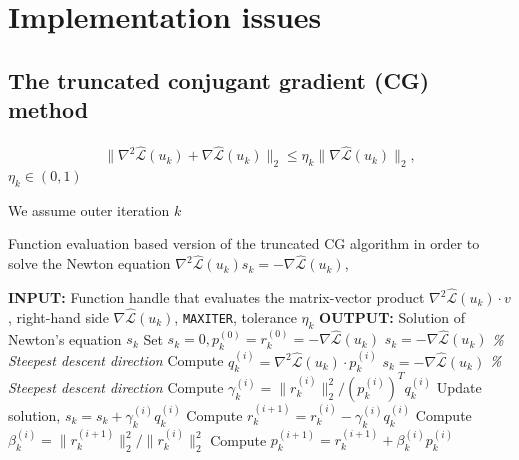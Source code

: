 \chapter{Implementation issues}
\section{The truncated conjugant gradient (CG) method}
\label{CGapp}
\begin{align}
 \label{CGcond}
 \|\nabla^2 \hat{\mathcal L}(u_k) + \nabla \hat{\mathcal L}(u_k)\|_2 \leq \eta_k \|\nabla\hat{\mathcal L}(u_k)\|_2,
\end{align}
$\eta_k \in (0,1)$

We assume outer iteration $k$
\begin{algorithm}[H]
\caption{Function evaluation based version of the truncated CG algorithm in order to solve the Newton equation $\nabla^2 \hat{\mathcal L}(u_k) s_k = - \nabla \hat{\mathcal L}(u_k)$, \cite{H08}}
\label{alg:serCG}
\begin{algorithmic}
\STATE \textbf{INPUT: } Function handle that evaluates the matrix-vector product $\nabla^2 \hat{\mathcal L}(u_k) \cdot v$, right-hand side $\nabla \hat{\mathcal L}(u_k)$, \texttt{MAXITER}, tolerance $\eta_k$
\STATE \textbf{OUTPUT: } Solution of Newton's equation $s_k$
\STATE Set $s_k = 0, p_k^{(0)} = r_k^{(0)} = - \nabla \hat{\mathcal L}(u_k)$
\STATE $s_k =  -\nabla \hat{\mathcal L}(u_k)$ \quad \textit{\% Steepest descent direction}
\RETURN
\ENDIF
\ENDIF
\STATE Compute $q_k^{(i)} = \nabla^2 \hat{\mathcal L}(u_k) \cdot p_k^{(i)}$
\STATE $s_k =  -\nabla \hat{\mathcal L}(u_k)$ \quad \textit{\% Steepest descent direction}
\RETURN
\ENDIF
\ENDIF
\STATE Compute $\gamma_k^{(i)} =  \|r_k^{(i)}\|^2_2 / (p_k^{(i)})^T q_k^{(i)} $
\STATE Update solution, $s_k = s_k + \gamma_k^{(i)} q_k^{(i)}$%
\STATE Compute $r_k^{(i+1)} = r_k^{(i)} - \gamma_k^{(i)} q_k^{(i)}$
\STATE Compute $\beta_k^{(i)} = \|r_k^{(i+1)}\|_2^2 / \|r_k^{(i)}\|_2^2$
\STATE Compute $p_k^{(i+1)} = r_k^{(i+1)} + \beta_k^{(i)} p_k^{(i)}$
\ENDFOR
\end{algorithmic}
\end{algorithm}

